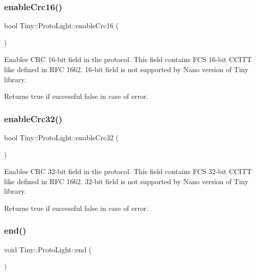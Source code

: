 \subsubsection{\texorpdfstring{enable\+Crc16()}{enableCrc16()}}
{\footnotesize\ttfamily bool Tiny\+::\+Proto\+Light\+::enable\+Crc16 (\begin{DoxyParamCaption}{ }\end{DoxyParamCaption})}

Enables C\+RC 16-\/bit field in the protocol. This field contains F\+CS 16-\/bit C\+C\+I\+TT like defined in R\+FC 1662. 16-\/bit field is not supported by Nano version of Tiny library. \begin{DoxyReturn}{Returns}
true if successful false in case of error. 
\end{DoxyReturn}
\mbox{\label{classTiny_1_1ProtoLight_a8ae8a3ace46234a65f83c564dc56fd26}} 
\subsubsection{\texorpdfstring{enable\+Crc32()}{enableCrc32()}}
{\footnotesize\ttfamily bool Tiny\+::\+Proto\+Light\+::enable\+Crc32 (\begin{DoxyParamCaption}{ }\end{DoxyParamCaption})}

Enables C\+RC 32-\/bit field in the protocol. This field contains F\+CS 32-\/bit C\+C\+I\+TT like defined in R\+FC 1662. 32-\/bit field is not supported by Nano version of Tiny library. \begin{DoxyReturn}{Returns}
true if successful false in case of error. 
\end{DoxyReturn}
\mbox{\label{classTiny_1_1ProtoLight_a948b2a0e37177b7434581adc64b36497}} 
\subsubsection{\texorpdfstring{end()}{end()}}
{\footnotesize\ttfamily void Tiny\+::\+Proto\+Light\+::end (\begin{DoxyParamCaption}{ }\end{DoxyParamCaption})}

